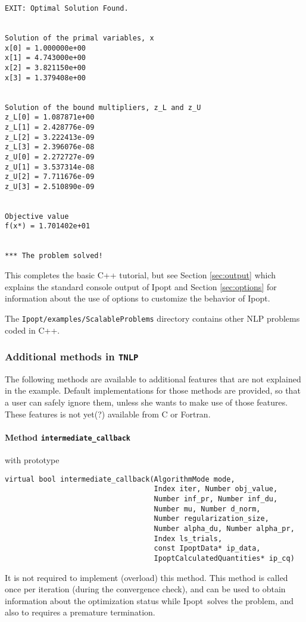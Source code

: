 \documentclass[10pt]{article}
\newcommand{\Ipopt}{{\sc Ipopt}}
\begin{document}
\begin{footnotesize}
\begin{verbatim}
EXIT: Optimal Solution Found.


Solution of the primal variables, x
x[0] = 1.000000e+00
x[1] = 4.743000e+00
x[2] = 3.821150e+00
x[3] = 1.379408e+00


Solution of the bound multipliers, z_L and z_U
z_L[0] = 1.087871e+00
z_L[1] = 2.428776e-09
z_L[2] = 3.222413e-09
z_L[3] = 2.396076e-08
z_U[0] = 2.272727e-09
z_U[1] = 3.537314e-08
z_U[2] = 7.711676e-09
z_U[3] = 2.510890e-09


Objective value
f(x*) = 1.701402e+01


*** The problem solved!
\end{verbatim}
\end{footnotesize}

This completes the basic C++ tutorial, but see Section
\ref{sec:output} which explains the standard console output of \Ipopt
and Section \ref{sec:options} for information about the use of options
to customize the behavior of \Ipopt.

The {\tt Ipopt/examples/ScalableProblems} directory contains other NLP
problems coded in C++.

\subsubsection{Additional methods in {\tt TNLP}}\label{sec:add_meth}

The following methods are available to additional features that are
not explained in the example.  Default implementations for those
methods are provided, so that a user can safely ignore them, unless
she wants to make use of those features.  These features is not yet(?)
available from C or Fortran.

\paragraph{Method \texttt{intermediate\_callback}} with prototype
\begin{verbatim}
virtual bool intermediate_callback(AlgorithmMode mode,
                                   Index iter, Number obj_value,
                                   Number inf_pr, Number inf_du,
                                   Number mu, Number d_norm,
                                   Number regularization_size,
                                   Number alpha_du, Number alpha_pr,
                                   Index ls_trials,
                                   const IpoptData* ip_data,
                                   IpoptCalculatedQuantities* ip_cq)
\end{verbatim}
It is not required to implement (overload) this method.  This method
is called once per iteration (during the convergence check), and can
be used to obtain information about the optimization status while
\Ipopt\ solves the problem, and also to requires a premature
termination.
\end{document}
